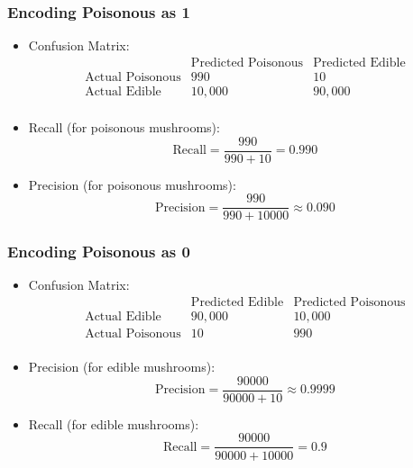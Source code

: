 \begin{notechapter}
\subsubsection{Encoding Poisonous as 1}
\begin{itemize}
    \item Confusion Matrix:
    \[
    \begin{array}{c|cc}
        & \text{Predicted Poisonous} & \text{Predicted Edible} \\
        \hline
        \text{Actual Poisonous} & 990 & 10 \\
        \text{Actual Edible} & 10,000 & 90,000 \\
    \end{array}
    \]
    \item Recall (for poisonous mushrooms):
    \[
    \text{Recall} = \frac{990}{990 + 10} = 0.990
    \]
    \item Precision (for poisonous mushrooms):
    \[
    \text{Precision} = \frac{990}{990 + 10000} \approx 0.090
    \]
\end{itemize}

\subsubsection{Encoding Poisonous as 0}
\begin{itemize}
    \item Confusion Matrix:
    \[
    \begin{array}{c|cc}
        & \text{Predicted Edible} & \text{Predicted Poisonous} \\
        \hline
        \text{Actual Edible} & 90,000 & 10,000 \\
        \text{Actual Poisonous} & 10 & 990 \\
    \end{array}
    \]
    \item Precision (for edible mushrooms):
    \[
    \text{Precision} = \frac{90000}{90000 + 10} \approx 0.9999
    \]
    \item Recall (for edible mushrooms):
    \[
    \text{Recall} = \frac{90000}{90000 + 10000} = 0.9
    \]
\end{itemize}


\end{notechapter}
